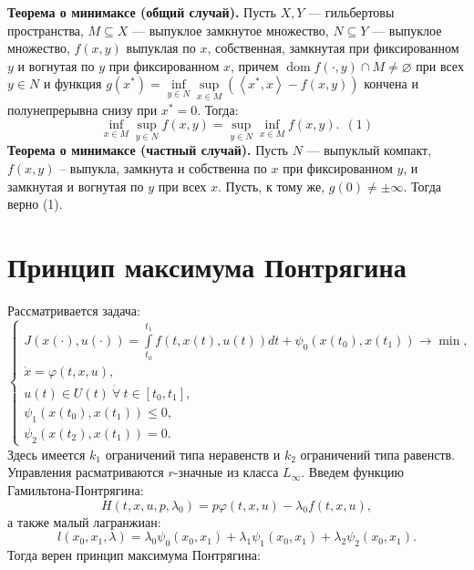 \documentclass[a4paper,12pt]{scrartcl}
\newcommand{\dom}{\mathop{\mathrm{dom}}}
\newcommand{\scalar}[2]{\left<#1,#2\right>}
\begin{document}
\textbf{Теорема о минимаксе (общий случай).} Пусть $X,Y$ --- гильбертовы пространства, $M\subseteq X$ --- выпуклое замкнутое множество, $N\subseteq Y$ --- выпуклое множество, $f(x,y)$ выпуклая по $x$, собственная, замкнутая при фиксированном $y$ и вогнутая по $y$ при фиксированном $x$, причем $\dom f(\cdot,y)\cap M\neq \varnothing$ при всех $y\in N$ и функция $g(x^*) = \inf\limits_{y\in N}\sup\limits_{x\in M}(\scalar{x^*}{x} - f(x,y))$ кончена и полунепрерывна снизу при $x^* = 0$. Тогда:
$$
\inf\limits_{x\in M}\sup\limits_{y\in N}f(x,y) = \sup\limits_{y\in N}\inf\limits_{x\in M}f(x,y).\ \ (1)
$$
\textbf{Теорема о минимаксе (частный случай).} Пусть $N$ --- выпуклый компакт, $f(x,y)$ -- выпукла, замкнута и собственна по $x$ при фиксированном $y$, и замкнутая и вогнутая по $y$ при всех $x$. Пусть, к тому же,  $g(0)\neq \pm\infty$. Тогда верно (1).
\section{Принцип максимума Понтрягина}
Рассматривается задача: 
$$
\begin{cases}
J(x(\cdot),u(\cdot)) = \int\limits_{t_0}^{t_1}f(t,x(t),u(t))dt + \psi_0(x(t_0),x(t_1)) \to\min,\\
\dot{x} = \varphi(t,x,u),\\
u(t)\in U(t)\ \dot{\forall}\ t\in[t_0,t_1],\\
\psi_1(x(t_0),x(t_1)) \leqslant 0,\\
\psi_2(x(t_2),x(t_1)) = 0.
\end{cases}
$$
Здесь имеется $k_1$ ограничений типа неравенств и $k_2$ ограничений типа равенств. Управления расматриваются $r$-значные из класса $L_\infty$. Введем функцию Гамильтона-Понтрягина:
$$
H(t,x,u,p,\lambda_0) = p\varphi(t,x,u) - \lambda_0 f(t,x,u),
$$
а также малый лагранжиан:
$$
l(x_0,x_1,\lambda) = \lambda_0\psi_0(x_0,x_1) + \lambda_1\psi_1(x_0,x_1) + \lambda_2\psi_2(x_0,x_1).
$$
Тогда верен принцип максимума Понтрягина:
\end{document}
